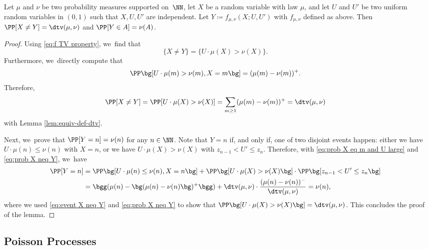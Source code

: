 \begin{lem}
\label{lem:coupling-dtv}
Let $\mu$ and $\nu$ be two probability measures supported on~$\NN$, let $X$ be a random variable with law $\mu$, and let $U$ and $U'$ be two uniform random variables in $(0, 1)$ such that $X, U, U'$ are independent. Let $Y \coloneqq f_{\mu, \nu}(X; U, U')$ with $f_{\mu, \nu}$ defined as above. Then $\PP[X \ne Y] = \dtv(\mu, \nu)$ and $\PP[Y \in A] = \nu(A)$.
\end{lem}

\begin{proof}
Using \eqref{eq:f TV property}, we~find that
\begin{equation}
\label{eq:event X neq Y}
\{X \ne Y\}=\{U \cdot \mu(X) > \nu(X)\}.
\end{equation}
Furthermore, we~directly compute that
\begin{equation}
\label{eq:prob X eq m and U large}
\PP\bg[U\cdot \mu(m)> \nu(m), X = m\bg] = (\mu(m) - \nu(m))^+.
\end{equation}
Therefore,
\begin{equation}
\label{eq:prob X neq Y}
\PP[X \ne Y] = \PP[U \cdot \mu(X) > \nu(X)] = \sum_{m \ge 1} (\mu(m) - \nu(m))^+ = \dtv(\mu, \nu)
\end{equation}
with Lemma \ref{lem:equiv-def-dtv}.

Next, we~prove that $\PP[Y = n] = \nu(n)$ for any $n \in \NN$. Note that $Y = n$ if, and only if, one of two disjoint events happen: either we have $U \cdot \mu(n)\le \nu(n)$ with $X = n$, or we have $U\cdot \mu(X) > \nu(X)$ with $z_{n-1} < U' \le z_n$. Therefore, with \eqref{eq:prob X eq m and U large} and \eqref{eq:prob X neq Y}, we~have
\begin{align*}
\PP[Y = n]
&= \PP\bg[U \cdot \mu(n)\le \nu(n), X = n\bg] + \PP\bg[U\cdot \mu(X) > \nu(X)\bg] \cdot \PP\bg[z_{n-1} < U' \le z_n\bg] \\
&= \bgg(\mu(n) - \bg(\mu(n) - \nu(n)\bg)^+\bgg) + \dtv(\mu, \nu) \cdot \frac{(\mu(n) - \nu(n))^-}{\dtv(\mu, \nu)} = \nu(n),
\end{align*}
where we used \eqref{eq:event X neq Y} and \eqref{eq:prob X neq Y} to show that $\PP\bg[U\cdot \mu(X) > \nu(X)\bg]=\dtv(\mu,\nu)$.
This concludes the proof of the lemma.
\end{proof}

\subsection{Poisson Processes}

